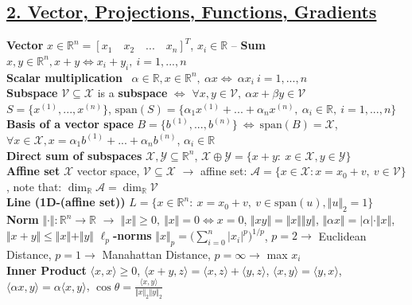 \documentclass[a4paper]{article}
\begin{document}
\subsection*{\underline{2. Vector, Projections, Functions, Gradients}}
\textbf{Vector} $x \in \mathbb{R}^n = [x_1 \quad x_2 \quad ... \quad x_n]^T$, $x_i\in\mathbb{R}$ -- 
\textbf{Sum} $x, y \in \mathbb{R}^n, x+y \iff x_i+y_i, \ i=1,...,n$\\
\textbf{Scalar multiplication} \ $\alpha \in \mathbb{R}, x \in \mathbb{R}^n, \ \alpha x \iff \ \alpha{x_i} \ i=1,...,n $\\
\textbf{Subspace} $\mathcal{V} \subseteq \mathcal{X}$ is a \textbf{subspace} $\iff$ $\forall x, y \in \mathcal{V}, \ \alpha{x}+\beta{y}\in\mathcal{V}$\\
$S=\{x^{(1)},...,x^{(n)}\}$, $\text{span}(S)=\{\alpha_1{x^{(1)}}+...+\alpha_n{x^{(n)}}, \ \alpha_i \in \mathbb{R}, \ i=1,...,n\}$\\
\textbf{Basis of a vector space} $B=\{b^{(1)}, ..., b^{(n)}\} \ \iff \ \text{span}(B)=\mathcal{X}$, $\forall x \in \mathcal{X}, x=\alpha_1{b^{(1)}+...+\alpha_n{b^{(n)}}}$, $\alpha_i\in\mathbb{R}$\\
\textbf{Direct sum of subspaces} $\mathcal{X,Y}\subseteq \mathbb{R}^n$, $\mathcal{X} \oplus \mathcal{Y}=\{x+y: \ x\in\mathcal{X}, y\in\mathcal{Y}\}$\\
\textbf{Affine set} $\mathcal{X}$ vector space, $\mathcal{V}\subseteq\mathcal{X}$ $\to$ affine set: $\mathcal{A}=\{x\in\mathcal{X}: x=x_0+v, \ v\in\mathcal{V}\}$, note that: $\dim_{\mathbb{R}}{\mathcal{A}}=\dim_{\mathbb{R}}{\mathcal{V}}$\\
\textbf{Line (1D-(affine set))} $L=\{x\in\mathbb{R}^n: \ x=x_0+v, \ v \in \text{span}(u), \Vert u \Vert_2=1\}$\\
\textbf{Norm} $\Vert \cdot \Vert: \mathbb{R}^n \to \mathbb{R}$ $\to$ $\Vert x \Vert \ge 0, \ \Vert x \Vert = 0 \iff x=0 $, 
$\Vert xy \Vert = \Vert x \Vert \Vert y \Vert$, $\Vert \alpha{x} \Vert =\vert \alpha \vert \cdot \Vert x \Vert$, 
$\Vert x+y \Vert \le \Vert x \Vert + \Vert y \Vert$ 
\textbf{$\ell_p$-norms} $\Vert x \Vert_p = \biggl(
    \sum_{i=0}^n{\vert x_i \vert}^p
\biggr)^{1/p}$, $p=2 \to $ Euclidean Distance, $p=1 \to$ Manahattan Distance, $p=\infty\to$ max $x_i$\\
\textbf{Inner Product}  $\langle x,x \rangle \ge 0$, $\langle x+y, z \rangle = \langle x,z \rangle + \langle y,z\rangle$, $\langle x,y\rangle=\langle y,x \rangle$, $\langle \alpha{x}, y \rangle=\alpha{\langle x,y \rangle }$, $\cos\theta=\frac{\langle{x,y}\rangle}{\Vert{x}\Vert_2 \Vert{y}\Vert_2 }$ \\
\end{document}
